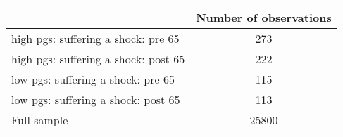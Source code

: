 % 
\begin{tabular}{lc}
  \toprule
 & Number of observations \\ 
  \midrule
high pgs: suffering a shock: pre 65 & 273 \\ 
   \midrule
high pgs: suffering a shock: post 65 & 222 \\ 
  low pgs: suffering a shock: pre 65 & 115 \\ 
  low pgs: suffering a shock: post 65 & 113 \\ 
  Full sample & 25800 \\ 
   \bottomrule
\end{tabular}
